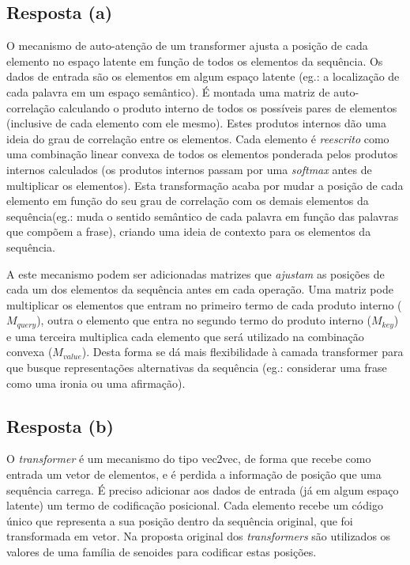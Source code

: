 \documentclass[final,3p]{elsarticle}
\numberwithin{equation}{section}
\begin{document}
    \subsection{Resposta \textbf{(a)}}
        O mecanismo de auto-atenção de um transformer ajusta a posição de cada elemento no espaço latente em função de todos os elementos da sequência. Os dados de entrada são os elementos em algum espaço latente (eg.: a localização de cada palavra em um espaço semântico). É montada uma matriz de auto-correlação calculando o produto interno de todos os possíveis pares de elementos (inclusive de cada elemento com ele mesmo). Estes produtos internos dão uma ideia do grau de correlação entre os elementos. Cada elemento é \emph{reescrito} como uma combinação linear convexa de todos os elementos ponderada pelos produtos internos calculados (os produtos internos passam por uma \emph{softmax} antes de multiplicar os elementos). Esta transformação acaba por mudar a posição de cada elemento em função do seu grau de correlação com os demais elementos da sequência(eg.: muda o sentido semântico de cada palavra em função das palavras que compõem a frase), criando uma ideia de contexto para os elementos da sequência.

        A este mecanismo podem ser adicionadas matrizes que \emph{ajustam} as posições de cada um dos elementos da sequência antes em cada operação. Uma matriz pode multiplicar os elementos que entram no primeiro termo de cada produto interno ($M_{query}$), outra o elemento que entra no segundo termo do produto interno ($M_{key}$) e uma terceira multiplica cada elemento que será utilizado na combinação convexa ($M_{value}$). Desta forma se dá mais flexibilidade à camada transformer para que busque representações alternativas da sequência (eg.: considerar uma frase como uma ironia ou uma afirmação).

    \subsection{Resposta \textbf{(b)}}

        O \emph{transformer} é um mecanismo do tipo vec2vec, de forma que recebe como entrada um vetor de elementos, e é perdida a informação de posição que uma sequência carrega. É preciso adicionar aos dados de entrada (já em algum espaço latente) um termo de codificação posicional. Cada elemento recebe um código único que representa a sua posição dentro da sequência original, que foi transformada em vetor. Na proposta original dos \emph{transformers} são utilizados os valores de uma família de senoides para codificar estas posições.
\end{document}
